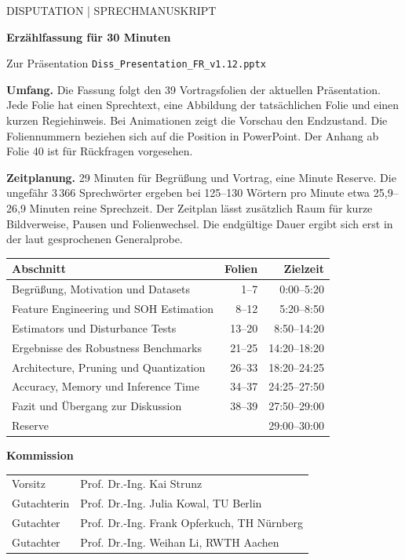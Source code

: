 \documentclass[11pt,a4paper]{article}
\begin{document}
{\small\color{tured} DISPUTATION | SPRECHMANUSKRIPT}
\vspace{4mm}

{\LARGE\bfseries Erzählfassung für 30 Minuten\par}
{\large Zur Präsentation \texttt{Diss\_Presentation\_FR\_v1.12.pptx}\par}
\vspace{3mm}

\textbf{Umfang.} Die Fassung folgt den 39 Vortragsfolien der aktuellen
Präsentation. Jede Folie hat einen Sprechtext, eine Abbildung der tatsächlichen
Folie und einen kurzen Regiehinweis. Bei Animationen zeigt die Vorschau den Endzustand. Die Foliennummern beziehen sich auf die
Position in PowerPoint. Der Anhang ab Folie 40 ist für Rückfragen vorgesehen.

\textbf{Zeitplanung.} 29 Minuten für Begrüßung und Vortrag, eine Minute Reserve.
Die ungefähr 3\,366 Sprechwörter ergeben bei 125--130 Wörtern pro Minute
etwa 25{,}9--26{,}9 Minuten reine Sprechzeit. Der Zeitplan lässt
zusätzlich Raum für kurze Bildverweise, Pausen und Folienwechsel.
Die endgültige Dauer ergibt sich erst in der laut gesprochenen Generalprobe.

\renewcommand{\arraystretch}{1.28}
\begin{tabularx}{\linewidth}{@{}>{\raggedright\arraybackslash}Xrr@{}}
\toprule
Abschnitt & Folien & Zielzeit \\
\midrule
Begrüßung, Motivation und Datasets & 1--7 & 0:00--5:20 \\
Feature Engineering und SOH Estimation & 8--12 & 5:20--8:50 \\
Estimators und Disturbance Tests & 13--20 & 8:50--14:20 \\
Ergebnisse des Robustness Benchmarks & 21--25 & 14:20--18:20 \\
Architecture, Pruning und Quantization & 26--33 & 18:20--24:25 \\
Accuracy, Memory und Inference Time & 34--37 & 24:25--27:50 \\
Fazit und Übergang zur Diskussion & 38--39 & 27:50--29:00 \\
\midrule
Reserve & & 29:00--30:00 \\
\bottomrule
\end{tabularx}

\vspace{4mm}
\textbf{Kommission}\par
\begin{tabularx}{\linewidth}{@{}l>{\raggedright\arraybackslash}X@{}}
Vorsitz & Prof. Dr.-Ing. Kai Strunz \\
Gutachterin & Prof. Dr.-Ing. Julia Kowal, TU Berlin \\
Gutachter & Prof. Dr.-Ing. Frank Opferkuch, TH Nürnberg \\
Gutachter & Prof. Dr.-Ing. Weihan Li, RWTH Aachen \\
\end{tabularx}
\end{document}
